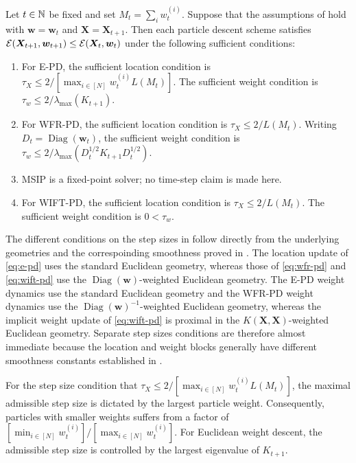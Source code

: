 \begin{prop}
\label{prop:geometry-step-sizes}
Let $t\in\mathbb{N}$ be fixed and set $M_t=\sum_iw_t^{(i)}$.
Suppose that the assumptions of  hold with $\bm{w}=\bm{w}_t$ and $\bm{X}=\bm{X}_{t+1}$. 
Then each particle descent scheme satisfies $\mathcal{E}(\bm{X}_{t+1},\bm{w}_{t+1})\leq\mathcal{E}(\bm{X}_t,\bm{w}_t)$ under the following sufficient conditions:
\begin{enumerate}
    \item For E-PD, the sufficient location condition is $\tau_X\leq 2/[\max_{i\in[N]} w_t^{(i)}L(M_t)]$. The sufficient weight condition is $\tau_w\leq 2/\lambda_{\max}(K_{t+1})$.
    \item For WFR-PD, the sufficient location condition is $\tau_X\leq 2/L(M_t)$. Writing $D_t=\operatorname{Diag}(\bm{w}_t)$, the sufficient weight condition is $\tau_w\leq 2/\lambda_{\max}(D_t^{1/2}K_{t+1}D_t^{1/2})$.
    \item MSIP is a fixed-point solver; no time-step claim is made here.
    \item For WIFT-PD, the sufficient location condition is $\tau_X\leq 2/L(M_t)$. The sufficient weight condition is $0< \tau_w$.
\end{enumerate}
\end{prop}

The different conditions on the step sizes in  follow directly from the underlying geometries and the correspoinding smoothness proved in . 
The location update of \eqref{eq:e-pd} uses the standard Euclidean geometry, whereas those of \eqref{eq:wfr-pd} and \eqref{eq:wift-pd} use the $\operatorname{Diag}(\bm{w})$-weighted Euclidean geometry. The E-PD weight dynamics use the standard Euclidean geometry and the WFR-PD weight dynamics use the $\operatorname{Diag}(\bm{w})^{-1}$-weighted Euclidean geometry, whereas the implicit weight update of \eqref{eq:wift-pd} is proximal in the $K(\bm{X},\bm{X})$-weighted Euclidean geometry.
Separate step sizes conditions are therefore almost immediate because the location and weight blocks generally have different smoothness constants established in .  

For the step size condition that $\tau_X\leq 2/[\max_{i\in[N]} w_t^{(i)}L(M_t)]$, the maximal admissible step size is dictated by the largest particle weight. Consequently, particles with smaller weights suffers from a factor of $[\min_{i\in[N]} w_t^{(i)}] / [\max_{i\in[N]} w_t^{(i)}]$.
For Euclidean weight descent, the admissible step size is controlled by the largest eigenvalue of $K_{t+1}$.



